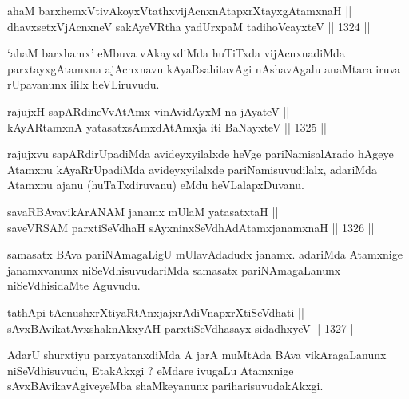 
\begin{shl}
ahaM barxhemxVtivAkoyxVtathxvijAcnxnAtapxrXtayxgAtamxnaH ||  \\
dhavxsetxV\s jAcnxneV sakAyeVR\s tha yadUrxpaM tadihoVcayxteV \hfill || 1324 ||  
\end{shl}

\begin{artha}
`ahaM barxhamx' eMbuva vAkayxdiMda huTiTxda vijAcnxnadiMda parxtayxgAtamxna ajAcnxnavu kAyaRsahitavAgi nAshavAgalu anaMtara iruva rUpavanunx ililx heVLiruvudu.
\end{artha}

\begin{shl}
rajujxH sapARdineVvA\s \s tAmx vinA\s vidAyxM na jAyateV || \\
kAyARtamxnA yatasatxsAmxdAtAmx\s ja iti BaNayxteV \hfill || 1325 ||  
\end{shl}

\begin{artha}
rajujxvu sapARdirUpadiMda avideyxyilalxde heVge pariNamisalArado hAgeye Atamxnu kAyaRrUpadiMda avideyxyilalxde pariNamisuvudilalx, adariMda Atamxnu ajanu (huTaTxdiruvanu) eMdu heVLalapxDuvanu.
\end{artha}


\begin{shl}
savaRBAvavikArANAM janamx mUlaM yatasatxtaH || \\
saveVRSAM parxtiSeVdhaH sAyxninxSeVdhAdAtamxjanamxnaH \hfill || 1326 ||  
\end{shl}

\begin{artha}
samasatx BAva pariNAmagaLigU mUlavAdadudx janamx. adariMda Atamxnige janamxvanunx niSeVdhisuvudariMda samasatx pariNAmagaLanunx niSeVdhisidaMte Aguvudu.
\end{artha}


\begin{shl}
tathA\s pi tAcnushxrXtiyaRtAnxjajxrAdiVnapxrXtiSeVdhati || \\
sAvxBAvikatAvxshaknAkxyAH parxtiSeVdhasayx sidadhxyeV \hfill || 1327 ||  
\end{shl}

\begin{artha}
AdarU shurxtiyu parxyatanxdiMda A jarA muMtAda BAva vikAragaLanunx niSeVdhisuvudu, EtakAkxgi ? eMdare ivugaLu Atamxnige sAvxBAvikavAgiveyeMba shaMkeyanunx pariharisuvudakAkxgi.
\end{artha}

